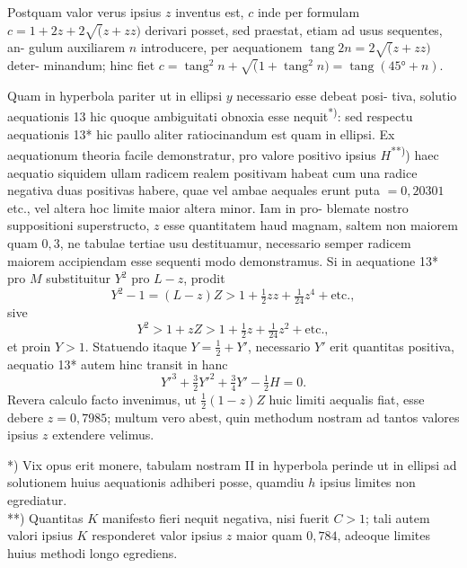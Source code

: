 \documentclass[12pt,a4paper]{article}
\newcommand{\tang}{\mathop{\mathrm{tang}}\nolimits}
\begin{document}
Postquam valor verus ipsius $z$ inventus est, $c$ inde per formulam $c =
1 + 2z + 2\surd(z + zz)$ derivari posset, sed praestat, etiam ad usus sequentes, an-
gulum auxiliarem $n$ introducere, per aequationem $\tang 2n = 2\surd(z + zz)$ deter-
minandum; hinc fiet $c = \tang^2 n + \surd(1 + \tang^2 n) = \tang(45° + n)$.

Quam in hyperbola pariter ut in ellipsi $y$ necessario esse debeat posi-
tiva, solutio aequationis 13 hic quoque ambiguitati obnoxia esse nequit\textsuperscript{*)}: sed
respectu aequationis 13* hic paullo aliter ratiocinandum est quam in ellipsi.
Ex aequationum theoria facile demonstratur, pro valore positivo ipsius $H$\textsuperscript{**)})
haec aequatio siquidem ullam radicem realem positivam habeat cum una
radice negativa duas positivas habere, quae vel ambae aequales erunt puta
$= 0{,}20301$ etc., vel altera hoc limite maior altera minor. Iam in pro-
blemate nostro suppositioni superstructo, $z$ esse quantitatem haud magnam,
saltem non maiorem quam $0{,}3$, ne tabulae tertiae usu destituamur, necessario
semper radicem maiorem accipiendam esse sequenti modo demonstramus. Si
in aequatione 13* pro $M$ substituitur $Y^2$ pro $L - z$,
prodit
\[
Y^2 - 1 = (L - z)Z > 1 + \tfrac{1}{2}zz + \tfrac{1}{24}z^4 + \text{etc.},
\]
sive
\[
Y^2 > 1 + zZ > 1 + \tfrac{1}{2}z + \tfrac{1}{24}z^2 + \text{etc.},
\]
et proin $Y > 1$. Statuendo itaque $Y = \tfrac{1}{2} + Y'$, necessario $Y'$ erit quantitas
positiva, aequatio 13* autem hinc transit in hanc
\[
Y'^3 + \tfrac{3}{2}Y'^2 + \tfrac{3}{4}Y' - \tfrac{1}{2}H = 0.
\]
Revera calculo facto invenimus, ut $\tfrac{1}{2}(1 - z)Z$ huic limiti aequalis fiat, esse debere
$z = 0{,}7985$; multum vero abest, quin methodum nostram ad tantos valores ipsius $z$ extendere velimus.

\begin{flushright}
\small\begin{minipage}{0.85\textwidth}
\raggedleft
*) Vix opus erit monere, tabulam nostram II in hyperbola perinde ut in ellipsi ad solutionem huius
aequationis adhiberi posse, quamdiu $h$ ipsius limites non egrediatur.\\
**) Quantitas $K$ manifesto fieri nequit negativa, nisi fuerit $C > 1$; tali autem valori ipsius $K$ responderet
valor ipsius $z$ maior quam $0{,}784$, adeoque limites huius methodi longo egrediens.
\end{minipage}
\end{flushright}
\end{document}
